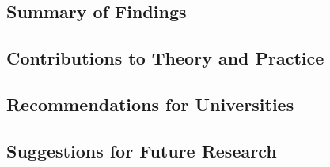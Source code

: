 \documentclass{singlecol-new}
\theoremstyle{TH}{
\newtheorem{lemma}{Lemma}
\newtheorem{theorem}[lemma]{Theorem}
\newtheorem{corrolary}[lemma]{Corrolary}
\newtheorem{conjecture}[lemma]{Conjecture}
\newtheorem{proposition}[lemma]{Proposition}
\newtheorem{claim}[lemma]{Claim}
\newtheorem{stheorem}[lemma]{Wrong Theorem}
\newtheorem{algorithm}{Algorithm}
}
\theoremstyle{THrm}{
\newtheorem{definition}{Definition}[section]
\newtheorem{question}{Question}[section]
\newtheorem{remark}{Remark}
\newtheorem{scheme}{Scheme}
}
\theoremstyle{THhit}{
\newtheorem{case}{Case}[section]
}
\begin{document}
\subsection{Summary of Findings}
\subsection{Contributions to Theory and Practice}
\subsection{Recommendations for Universities}
\subsection{Suggestions for Future Research}




%
%
%

\end{document}
